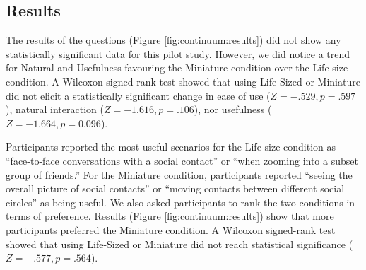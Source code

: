 \subsection{Results}

The results of the questions (Figure \ref{fig:continuum:results}) did not show any statistically significant data for this pilot study. However, we did notice a trend for Natural and Usefulness favouring the Miniature condition over the Life-size condition. A Wilcoxon signed-rank test showed that using Life-Sized or Miniature did not elicit a statistically significant change in ease of use ($Z=-.529, p=.597$), natural interaction ($Z=-1.616, p=.106$), nor usefulness ($Z=-1.664, p=0.096$). 

Participants reported the most useful scenarios for the Life-size condition as \enquote{face-to-face conversations with a social contact} or \enquote{when zooming into a subset group of friends.} For the Miniature condition, participants reported \enquote{seeing the overall picture of social contacts} or \enquote{moving contacts between different social circles} as being useful. We also asked participants to rank the two conditions in terms of preference. Results (Figure \ref{fig:continuum:results}) show that more participants preferred the Miniature condition. A Wilcoxon signed-rank test showed that using Life-Sized or Miniature did not reach statistical significance ($Z=-.577, p=.564$).

